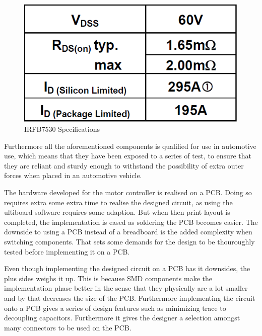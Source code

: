 \begin{figure}[H]
	\centering
	\includegraphics[width=1\linewidth]{Hardware/Pictures/IRFB7530}
	\caption{IRFB7530 Specifications}
	\label{fig:MOSFET}
\end{figure}

Furthermore all the aforementioned components is qualified for use in automotive use, which means that they have been exposed to a series of test, to ensure that they are reliant and sturdy enough to withstand the possibility of extra outer forces when placed in an automotive vehicle. 

The hardware developed for the motor controller is realised on a PCB. Doing so requires extra some extra time to realise the designed circuit, as using the ultiboard software requires some adaption. But when then print layout is completed, the implementation is eased as soldering the PCB becomes easier. The downside to using a PCB instead of a breadboard is the added complexity when switching components. That sets some demands for the design to be thouroughly tested before implementing it on a PCB.

Even though implementing the designed circuit on a PCB has it downsides, the plus sides weighs it up. This is because SMD components make the implementation phase better in the sense that they physically are a lot smaller and by that decreases the size of the PCB. Furthermore implementing the circuit onto a PCB gives a series of design features such as minimizing trace to decoupling capacitors. Furthermore it gives the designer a selection amongst many connectors to be used on the PCB. 

